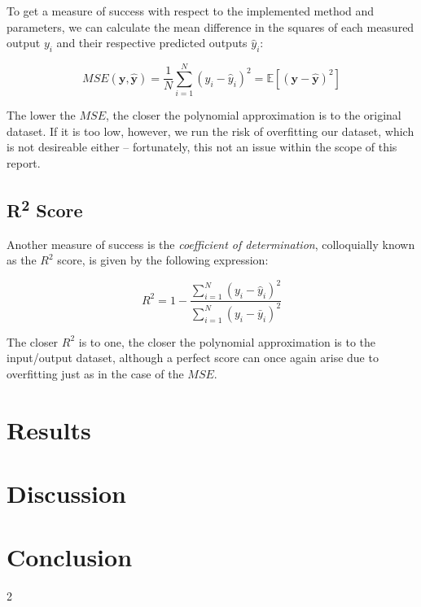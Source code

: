 \documentclass[a4paper,10pt,english]{article}
\begin{document}
\begin{multicols*}{2}
To get a measure of success with respect to the implemented method and parameters, we can calculate the mean difference in the squares of each measured output $y_i$ and their respective predicted outputs $\hat{y}_i$:

\begin{equation*}
MSE(\mathbf{y}, \mathbf{\hat{y}}) = \frac{1}{N} \sum_{i=1}^{N} (y_i - \hat{y}_i)^2 = \mathbb{E}\left[(\mathbf{y}-\hat{\mathbf{y}})^{2}\right]
\end{equation*}

The lower the $MSE$, the closer the polynomial approximation is to the original dataset.  If it is too low, however, we run the risk of overfitting our dataset, which is not desireable either – fortunately, this not an issue within the scope of this report.

\subsection*{R\textsuperscript{2} Score}

Another measure of success is the \textit{coefficient of determination}, colloquially known as the $R^2$ score, is given by the following expression:

\begin{equation*}
R^2 = 1 - \frac{\sum_{i=1}^N (y_i - \hat{y}_i)^2 }{\sum_{i=1}^N (y_i - \bar{y}_i)^2 }
\end{equation*}

The closer $R^2$ is to one, the closer the polynomial approximation is to the input/output dataset, although a perfect score can once again arise due to overfitting just as in the case of the $MSE$.

\section*{Results}

\section*{Discussion}

\section*{Conclusion}

{}

\end{multicols*}{2}
\end{document}
